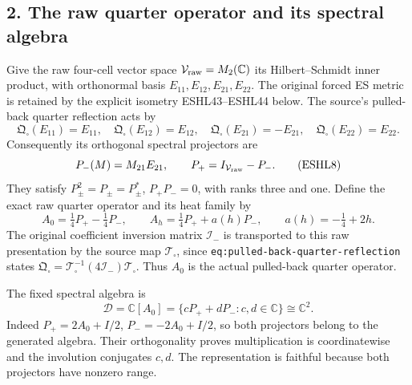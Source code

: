 \documentclass[
  10pt,
  a4paper,
]{article}
\begin{document}
\subsection{2. The raw quarter operator and its spectral
algebra}\label{the-raw-quarter-operator-and-its-spectral-algebra}

Give the raw four-cell vector space
\(\mathcal V_{\rm raw}=M_2(\mathbb C)\) its Hilbert--Schmidt inner
product, with orthonormal basis \(E_{11},E_{12},E_{21},E_{22}\). The
original forced ES metric is retained by the explicit isometry
ESHL43--ESHL44 below. The source's pulled-back quarter reflection acts
by \[
\mathfrak Q_\square(E_{11})=E_{11},\quad
\mathfrak Q_\square(E_{12})=E_{12},\quad
\mathfrak Q_\square(E_{21})=-E_{21},\quad
\mathfrak Q_\square(E_{22})=E_{22}.
\tag{ESHL7}
\] Consequently its orthogonal spectral projectors are \[
P_-(M)=M_{21}E_{21},\qquad P_+=I_{\mathcal V_{\rm raw}}-P_-.
\tag{ESHL8}
\] They satisfy \(P_\pm^2=P_\pm=P_\pm^*\), \(P_+P_-=0\), with ranks
three and one. Define the exact raw quarter operator and its heat family
by \[
A_0=\tfrac14P_+-\tfrac14P_-,\qquad
A_h=\tfrac14P_++a(h)P_-,\qquad a(h)=-\tfrac14+2h.
\tag{ESHL9}
\] The original coefficient inversion matrix \(\mathcal I_-\) is
transported to this raw presentation by the source map
\(\mathcal T_\square\), since \texttt{eq:\allowbreak{}pulled-\allowbreak{}back-\allowbreak{}quarter-\allowbreak{}reflection}
states
\(\mathfrak Q_\square=\mathcal T_\square^{-1}(4\mathcal I_-)\mathcal T_\square\).
Thus \(A_0\) is the actual pulled-back quarter operator.

The fixed spectral algebra is \[
\mathcal D=\mathbb C[A_0]
=\{cP_++dP_-:c,d\in\mathbb C\}\cong\mathbb C^2.
\tag{ESHL10}
\] Indeed \(P_+=2A_0+I/2\), \(P_-=-2A_0+I/2\), so both projectors belong
to the generated algebra. Their orthogonality proves multiplication is
coordinatewise and the involution conjugates \(c,d\). The representation
is faithful because both projectors have nonzero range.
\end{document}
